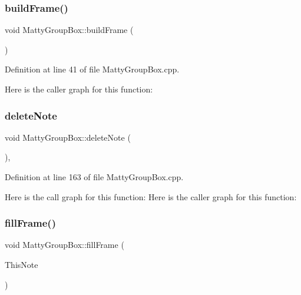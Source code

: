 \subsubsection{\texorpdfstring{build\+Frame()}{buildFrame()}}
{\footnotesize\ttfamily void Matty\+Group\+Box\+::build\+Frame (\begin{DoxyParamCaption}{ }\end{DoxyParamCaption})\hspace{0.3cm}{\ttfamily [private]}}



Definition at line 41 of file Matty\+Group\+Box.\+cpp.

Here is the caller graph for this function\+:
\hypertarget{classMattyGroupBox_ac7b7f1db6ea96e4c4b0f58fb87f86900}{}\label{classMattyGroupBox_ac7b7f1db6ea96e4c4b0f58fb87f86900} 
\subsubsection{\texorpdfstring{delete\+Note}{deleteNote}}
{\footnotesize\ttfamily void Matty\+Group\+Box\+::delete\+Note (\begin{DoxyParamCaption}{ }\end{DoxyParamCaption})\hspace{0.3cm}{\ttfamily [private]}, {\ttfamily [slot]}}



Definition at line 163 of file Matty\+Group\+Box.\+cpp.

Here is the call graph for this function\+:
Here is the caller graph for this function\+:
\hypertarget{classMattyGroupBox_a4cbc1800e9ec63cdd0e064d3a3738b80}{}\label{classMattyGroupBox_a4cbc1800e9ec63cdd0e064d3a3738b80} 
\subsubsection{\texorpdfstring{fill\+Frame()}{fillFrame()}}
{\footnotesize\ttfamily void Matty\+Group\+Box\+::fill\+Frame (\begin{DoxyParamCaption}\item[{class \hyperlink{classMattyNote}{Matty\+Note} \&}]{This\+Note }\end{DoxyParamCaption})}




